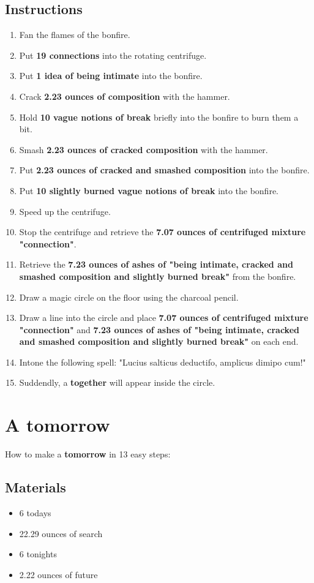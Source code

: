 \documentclass{article}
\begin{document}
\subsection{Instructions}\begin{enumerate}
\item 
Fan the flames of the bonfire.
\item 
Put \textbf{19 connections} into the rotating centrifuge.
\item 
Put \textbf{1 idea of being intimate} into the bonfire.
\item 
Crack \textbf{2.23 ounces of composition} with the hammer.
\item 
Hold \textbf{10 vague notions of break} briefly into the bonfire to burn them a bit.
\item 
Smash \textbf{2.23 ounces of cracked composition} with the hammer.
\item 
Put \textbf{2.23 ounces of cracked and smashed composition} into the bonfire.
\item 
Put \textbf{10 slightly burned vague notions of break} into the bonfire.
\item 
Speed up the centrifuge.
\item 
Stop the centrifuge and retrieve the \textbf{7.07 ounces of centrifuged mixture "connection"}.
\item 
Retrieve the \textbf{7.23 ounces of ashes of "being intimate, cracked and smashed composition and slightly burned break"} from the bonfire.
\item 
Draw a magic circle on the floor using the charcoal pencil.
\item 
Draw a line into the circle and place \textbf{7.07 ounces of centrifuged mixture "connection"} and \textbf{7.23 ounces of ashes of "being intimate, cracked and smashed composition and slightly burned break"} on each end.
\item 
Intone the following spell: "Lucius salticus deductifo, amplicus dimipo cum!"
\item 
Suddendly, a \textbf{together} will appear inside the circle.
\end{enumerate}
\newpage
\section{A tomorrow}How to make a \textbf{tomorrow} in 13 easy steps:

\subsection{Materials}\begin{itemize}
\item 
6 todays
\item 
22.29 ounces of search
\item 
6 tonights
\item 
2.22 ounces of future
\end{itemize}
\end{document}
